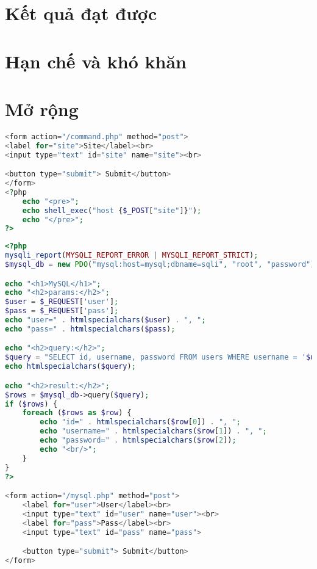 \documentclass[./../main.tex]{subfiles}
\begin{document}
\section{Kết quả đạt được}
\section{Hạn chế và khó khăn}
\section{Mở rộng}

\begin{lstlisting}[language=php, caption=Lỗ hổng Command Injection, label={src:cmdi}]
<form action="/command.php" method="post">
<label for="site">Site</label><br>
<input type="text" id="site" name="site"><br>

<button type="submit"> Submit</button>
</form>
<?php
    echo "<pre>";
    echo shell_exec("host {$_POST["site"]}");
    echo "</pre>";
?>
\end{lstlisting}


\begin{lstlisting}[language=php, caption=Lỗ hổng SQL Injection, label={src:sqli}]
<?php
mysqli_report(MYSQLI_REPORT_ERROR | MYSQLI_REPORT_STRICT);
$mysql_db = new PDO("mysql:host=mysql;dbname=sqli", "root", "password");

echo "<h1>MySQL</h1>";
echo "<h2>params:</h2>";
$user = $_REQUEST['user'];
$pass = $_REQUEST['pass'];
echo "user=" . htmlspecialchars($user) . ", ";
echo "pass=" . htmlspecialchars($pass);

echo "<h2>query:</h2>";
$query = "SELECT id, username, password FROM users WHERE username = '$user' and password = '$pass'";
echo htmlspecialchars($query);

echo "<h2>result:</h2>";
$rows = $mysql_db->query($query);
if ($rows) {
    foreach ($rows as $row) {
        echo "id=" . htmlspecialchars($row[0]) . ", ";
        echo "username=" . htmlspecialchars($row[1]) . ", ";
        echo "password=" . htmlspecialchars($row[2]);
        echo "<br/>";
    }
}
?>

<form action="/mysql.php" method="post">
    <label for="user">User</label><br>
    <input type="text" id="user" name="user"><br>
    <label for="pass">Pass</label><br>
    <input type="text" id="pass" name="pass">

    <button type="submit"> Submit</button>
</form>
\end{lstlisting}
\end{document}
